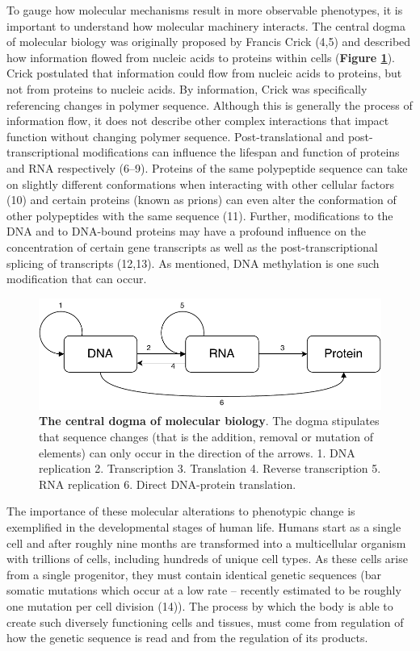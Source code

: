\documentclass[11pt,oneside]{bristolthesis}
\begin{document}
To gauge how molecular mechanisms result in more observable phenotypes, it is important to understand how molecular machinery interacts. The central dogma of molecular biology was originally proposed by Francis Crick (4,5) and described how information flowed from nucleic acids to proteins within cells (\textbf{Figure \ref{fig:central-dogma}}). Crick postulated that information could flow from nucleic acids to proteins, but not from proteins to nucleic acids. By information, Crick was specifically referencing changes in polymer sequence. Although this is generally the process of information flow, it does not describe other complex interactions that impact function without changing polymer sequence. Post-translational and post-transcriptional modifications can influence the lifespan and function of proteins and RNA respectively (6--9). Proteins of the same polypeptide sequence can take on slightly different conformations when interacting with other cellular factors (10) and certain proteins (known as prions) can even alter the conformation of other polypeptides with the same sequence (11). Further, modifications to the DNA and to DNA-bound proteins may have a profound influence on the concentration of certain gene transcripts as well as the post-transcriptional splicing of transcripts (12,13). As mentioned, DNA methylation is one such modification that can occur.




\begin{figure}

{\centering \includegraphics[width=1\linewidth]{figure/01-introduction/central-dogma} 

}

\caption[The central dogma of molecular biology]{\textbf{The central dogma of molecular biology}. The dogma stipulates that sequence changes (that is the addition, removal or mutation of elements) can only occur in the direction of the arrows. 1. DNA replication 2. Transcription 3. Translation 4. Reverse transcription 5. RNA replication 6. Direct DNA-protein translation.}\label{fig:central-dogma}
\end{figure}
The importance of these molecular alterations to phenotypic change is exemplified in the developmental stages of human life. Humans start as a single cell and after roughly nine months are transformed into a multicellular organism with trillions of cells, including hundreds of unique cell types. As these cells arise from a single progenitor, they must contain identical genetic sequences (bar somatic mutations which occur at a low rate -- recently estimated to be roughly one mutation per cell division (14)). The process by which the body is able to create such diversely functioning cells and tissues, must come from regulation of how the genetic sequence is read and from the regulation of its products.
\end{document}
